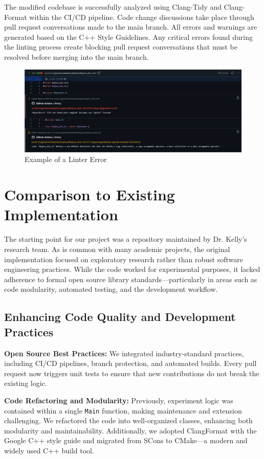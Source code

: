 \documentclass[12pt, titlepage]{article}
\begin{document}
The modified codebase is successfully analyzed using Clang-Tidy and Clang-Format within the CI/CD pipeline. 
Code change discussions take place through pull request conversations made to the main branch. 
All errors and warnings are generated based on the C++ Style Guidelines. 
Any critical errors found during the linting process create blocking pull request conversations that must be resolved before merging into the main branch.

\begin{figure}[h]
  \centering
  \includegraphics[width=1\textwidth]{linter-example.png}
  \caption{Example of a Linter Error}
  \label{fig:myimage}
\end{figure}

\section{Comparison to Existing Implementation}

The starting point for our project was a repository maintained by Dr. Kelly’s research team. As is common with many academic projects, the original implementation focused on exploratory research rather than robust software engineering practices. While the code worked for experimental purposes, it lacked adherence to formal open source library standards---particularly in areas such as code modularity, automated testing, and the development workflow.

\subsection{Enhancing Code Quality and Development Practices}

\textbf{Open Source Best Practices:}  
We integrated industry-standard practices, including CI/CD pipelines, branch protection, and automated builds. Every pull request now triggers unit tests to ensure that new contributions do not break the existing logic.

\medskip
\textbf{Code Refactoring and Modularity:}  
Previously, experiment logic was contained within a single \texttt{Main} function, making maintenance and extension challenging. We refactored the code into well-organized classes, enhancing both modularity and maintainability. Additionally, we adopted ClangFormat with the Google C++ style guide and migrated from SCons to CMake---a modern and widely used C++ build tool.
\end{document}

